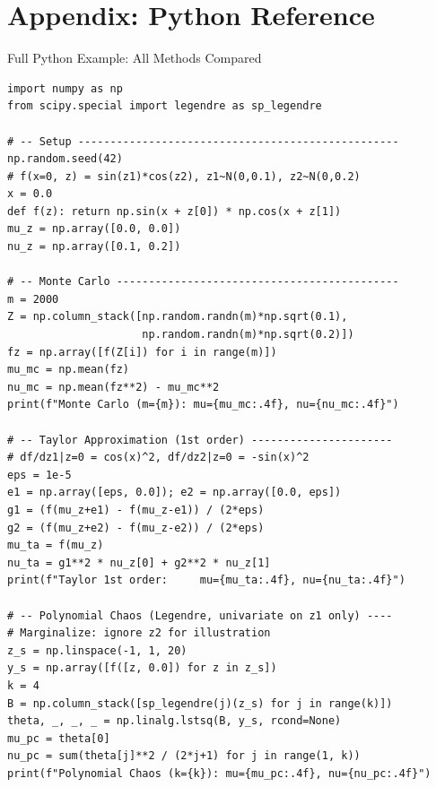 \documentclass[aspectratio=169,10pt]{beamer}
\begin{document}
\section*{Appendix: Python Reference}

\begin{frame}{Full Python Example: All Methods Compared}
\begin{lstlisting}
import numpy as np
from scipy.special import legendre as sp_legendre

# -- Setup --------------------------------------------------
np.random.seed(42)
# f(x=0, z) = sin(z1)*cos(z2), z1~N(0,0.1), z2~N(0,0.2)
x = 0.0
def f(z): return np.sin(x + z[0]) * np.cos(x + z[1])
mu_z = np.array([0.0, 0.0])
nu_z = np.array([0.1, 0.2])

# -- Monte Carlo --------------------------------------------
m = 2000
Z = np.column_stack([np.random.randn(m)*np.sqrt(0.1),
                     np.random.randn(m)*np.sqrt(0.2)])
fz = np.array([f(Z[i]) for i in range(m)])
mu_mc = np.mean(fz)
nu_mc = np.mean(fz**2) - mu_mc**2
print(f"Monte Carlo (m={m}): mu={mu_mc:.4f}, nu={nu_mc:.4f}")

# -- Taylor Approximation (1st order) ----------------------
# df/dz1|z=0 = cos(x)^2, df/dz2|z=0 = -sin(x)^2
eps = 1e-5
e1 = np.array([eps, 0.0]); e2 = np.array([0.0, eps])
g1 = (f(mu_z+e1) - f(mu_z-e1)) / (2*eps)
g2 = (f(mu_z+e2) - f(mu_z-e2)) / (2*eps)
mu_ta = f(mu_z)
nu_ta = g1**2 * nu_z[0] + g2**2 * nu_z[1]
print(f"Taylor 1st order:     mu={mu_ta:.4f}, nu={nu_ta:.4f}")

# -- Polynomial Chaos (Legendre, univariate on z1 only) ----
# Marginalize: ignore z2 for illustration
z_s = np.linspace(-1, 1, 20)
y_s = np.array([f([z, 0.0]) for z in z_s])
k = 4
B = np.column_stack([sp_legendre(j)(z_s) for j in range(k)])
theta, _, _, _ = np.linalg.lstsq(B, y_s, rcond=None)
mu_pc = theta[0]
nu_pc = sum(theta[j]**2 / (2*j+1) for j in range(1, k))
print(f"Polynomial Chaos (k={k}): mu={mu_pc:.4f}, nu={nu_pc:.4f}")
\end{lstlisting}
\end{frame}
\end{document}
